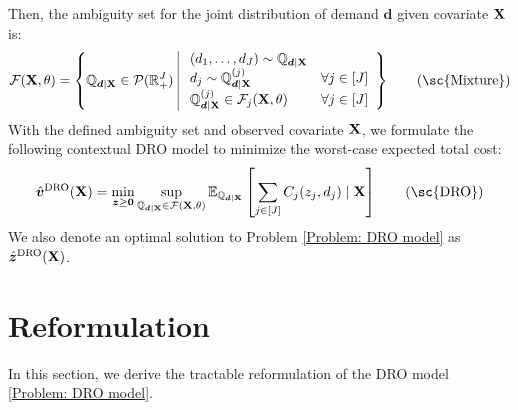 \documentclass[mnsc, nonblindrev]{informswp}
\newcommand{\1}[1]{\mathds{1}{\left(#1\right)}}
\begin{document}
Then, the ambiguity set for the joint distribution of demand $\bm d$ given covariate ${\mathbf{X}}$ is:
\begin{equation}
\mathcal{F}(\mb X, \theta) = \left \{ 
	\bbq_{\bm d \mid \mb X} \in \mathcal{P}(\bbr^J_+) \ 
	\begin{array}{|ll} 
	\ (d_1, \ldots, d_J) \sim \bbq_{\bm d \mid \mb X} \\ 
	\ d_j \sim \bbq^{(j)}_{\bm d \mid \mb X} & \forall j \in [J] \\ \
	\bbq^{(j)}_{\bm d \mid \mb X} \in \mathcal{F}_j(\mb X, \theta) & \forall j \in [J]
	\end{array}
	\right  \}
\label{Conditioanl Ambiguity Set}
\tag{\sc{Mixture}}
\end{equation}
With the defined ambiguity set and observed covariate ${\mathbf{X}}$, we formulate the following contextual DRO model to minimize the worst-case expected total cost:
\begin{equation}
\hat{\bm v}^{\text{DRO}}({\mb X})  = \min_{\bm z \geq \bm 0} \sup_{\bbq_{\bm d \mid \mb X} \in \mathcal{F}(\mb X, \theta)}  \mathbb{E}_{\bbq_{\bm d \mid \mb X}} \left[\sum_{j \in [J]}   C_j (z_j,  d_j)  \mid \mb X \right] 
\label{Problem: DRO model}
\tag{\sc{DRO}}
\end{equation}
We also denote an optimal solution to Problem \eqref{Problem: DRO model} as $\hat{\bm z}^{\text{DRO}}({{\mathbf{X}}})$.



\section{Reformulation}
In this section, we derive the tractable reformulation of the DRO model \eqref{Problem: DRO model}.
\end{document}
